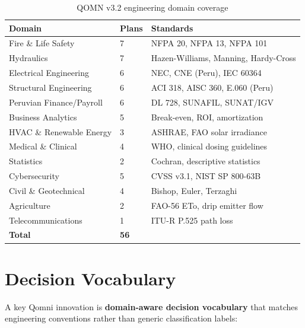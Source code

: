 \documentclass[11pt]{article}
\begin{document}
\begin{table}[h]
\centering
\caption{QOMN v3.2 engineering domain coverage}
\label{tab:domains}
\begin{tabular}{lll}
\toprule
\textbf{Domain} & \textbf{Plans} & \textbf{Standards} \\
\midrule
Fire \& Life Safety      & 7 & NFPA 20, NFPA 13, NFPA 101 \\
Hydraulics               & 7 & Hazen-Williams, Manning, Hardy-Cross \\
Electrical Engineering   & 6 & NEC, CNE (Peru), IEC 60364 \\
Structural Engineering   & 6 & ACI 318, AISC 360, E.060 (Peru) \\
Peruvian Finance/Payroll & 6 & DL 728, SUNAFIL, SUNAT/IGV \\
Business Analytics       & 5 & Break-even, ROI, amortization \\
HVAC \& Renewable Energy & 3 & ASHRAE, FAO solar irradiance \\
Medical \& Clinical      & 4 & WHO, clinical dosing guidelines \\
Statistics               & 2 & Cochran, descriptive statistics \\
Cybersecurity            & 5 & CVSS v3.1, NIST SP 800-63B \\
Civil \& Geotechnical    & 4 & Bishop, Euler, Terzaghi \\
Agriculture              & 2 & FAO-56 ETo, drip emitter flow \\
Telecommunications       & 1 & ITU-R P.525 path loss \\
\midrule
\textbf{Total} & \textbf{56} & \\
\bottomrule
\end{tabular}
\end{table}

\section{Decision Vocabulary}

A key Qomni innovation is \textbf{domain-aware decision vocabulary} that matches
engineering conventions rather than generic classification labels:
\end{document}
